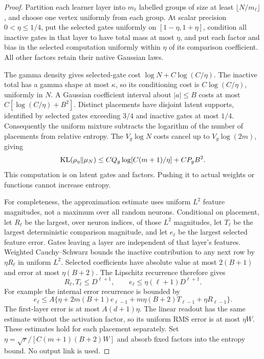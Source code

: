\begin{proof}
Partition each learner layer into $m_\ell$ labelled groups of size at
least $\lfloor N/m_\ell\rfloor$, and choose one vertex uniformly
from each group. At scalar precision $0<\eta\le1/4$, put the selected
gates uniformly on $[1-\eta,1+\eta]$, condition all inactive gates in
that layer to have total mass at most $\eta$, and put each factor and
bias in the selected computation uniformly within $\eta$ of its
comparison coefficient. All other factors retain their native Gaussian
laws.

The gamma density gives selected-gate cost
$\log N+C\log(C/\eta)$. The inactive total has a gamma shape at most
$\kappa$, so its conditioning cost is $C\log(C/\eta)$, uniformly
in $N$. A Gaussian coefficient interval about $|a|\le B$ costs at
most $C[\log(C/\eta)+B^2]$. Distinct placements have disjoint latent
supports, identified by selected gates exceeding $3/4$ and inactive
gates at most $1/4$. Consequently the uniform mixture subtracts the
logarithm of the number of placements from relative entropy.
The $V_g\log N$ costs cancel up to $V_g\log(2m)$, giving
\[
 \operatorname{KL}(\rho_\eta\Vert\mu_N)
 \le C Q_g\log[C(m+1)/\eta]+CP_gB^2.
\]
This computation is on latent gates and factors. Pushing it to actual
weights or functions cannot increase entropy.

For completeness, the approximation estimate uses uniform $L^2$
feature magnitudes, not a maximum over all random neurons. Conditional
on placement, let $R_\ell$ be the largest, over neuron indices, of
those $L^2$ magnitudes, let $T_\ell$ be the largest deterministic
comparison magnitude, and let $e_\ell$ be the largest selected
feature error. Gates leaving a layer are independent of that layer's
features. Weighted Cauchy--Schwarz bounds the inactive contribution to
any next row by $\eta R_\ell$ in uniform $L^2$. Selected coefficients
have absolute value at most $2(B+1)$ and error at most
$\eta(B+2)$. The Lipschitz recurrence therefore gives
\[
 R_\ell,T_\ell\le D^{\ell+1},\qquad
 e_\ell\le\eta(\ell+1)D^{\ell+1}.
\]
For example the internal error recurrence is bounded by
\[
 e_\ell\le A\{\eta+2m(B+1)e_{\ell-1}
         +m\eta(B+2)T_{\ell-1}+\eta R_{\ell-1}\}.
\]
The first-layer error is at most $A(d+1)\eta$. The linear readout
has the same estimate without the activation factor, so its uniform
RMS error is at most $\eta W$. These estimates hold for each
placement separately. Set $\eta=\sqrt r/[C(m+1)(B+2)W]$ and absorb
fixed factors into the entropy bound. No output link is used.
\end{proof}

